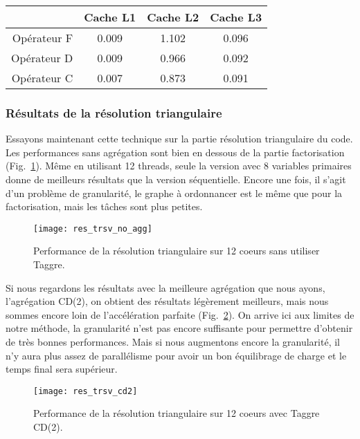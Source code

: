 \begin{center}
  \begin{tabular}{|r|c|c|c|}
    \hline
                & Cache L1 & Cache L2 & Cache L3 \\
    \hline
    Opérateur F &   0.009  &  1.102   &  0.096 \\
    Opérateur D &   0.009  &  0.966   &  0.092 \\
    Opérateur C &   0.007  &  0.873   &  0.091 \\
    \hline
  \end{tabular}
  \label{tab:cache_miss}
\end{center}

\subsubsection{Résultats de la résolution triangulaire}
Essayons maintenant cette technique sur la partie résolution triangulaire du code.
%
Les performances sans agrégation sont bien en dessous de la partie factorisation (Fig.~\ref{fig:res_trsv_no_agg}).
%
Même en utilisant 12 threads, seule la version avec 8 variables primaires donne de meilleurs résultats que la version séquentielle.
%
Encore une fois, il s'agit d'un problème de granularité, le graphe à ordonnancer est le même que pour la factorisation, mais les tâches sont plus petites.

\begin{figure}[!h]
  \centering
  \texttt{[image: res\_trsv\_no\_agg]}
  \caption{Performance de la résolution triangulaire sur 12 coeurs sans utiliser Taggre.}
  \label{fig:res_trsv_no_agg}
\end{figure}

Si nous regardons les résultats avec la meilleure agrégation que nous ayons, l'agrégation CD(2), on obtient des résultats légèrement meilleurs, mais nous sommes encore loin de l'accélération parfaite (Fig.~\ref{fig:res_trsv_cd2}).
%
On arrive ici aux limites de notre méthode, la granularité n'est pas encore suffisante pour permettre d'obtenir de très bonnes performances.
%
Mais si nous augmentons encore la granularité, il n'y aura plus assez de parallélisme pour avoir un bon équilibrage de charge et le temps final sera supérieur.

\begin{figure}[!h]
  \centering
  \texttt{[image: res\_trsv\_cd2]}
  \caption{Performance de la résolution triangulaire sur 12 coeurs avec Taggre CD(2).}
  \label{fig:res_trsv_cd2}
\end{figure}




